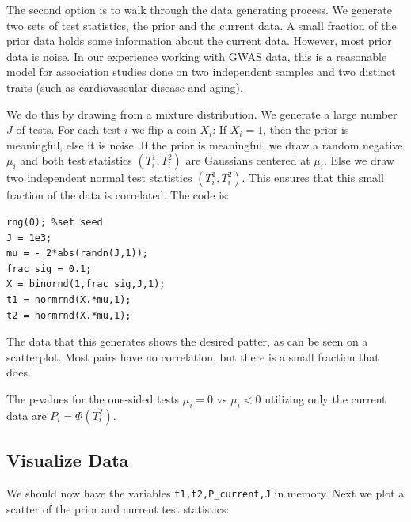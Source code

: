 \documentclass[english,11pt]{article} %
\begin{document}
The second option is to walk through the data generating process. We generate two sets of test statistics, the prior and the current data. A small fraction of the prior data holds some information about the current data. However, most prior data is noise. In our experience working with GWAS data, this is a reasonable model for association studies done on two independent samples and two distinct traits (such as cardiovascular disease and aging).

We do this by drawing from a mixture distribution. We generate a large number $J$ of tests. For each test $i$ we flip a coin $X_i$: If $X_i=1$, then the prior is meaningful, else it is noise. If the prior is meaningful, we draw a random negative $\mu_i$ and both test statistics $(T^{1}_i,T^{2}_i)$ are Gaussians centered at $\mu_i$. Else we draw two independent normal test statistics $(T^{1}_i,T^{2}_i)$. This ensures that this small fraction of the data is correlated. The code is:


\begin{verbatim}
rng(0); %set seed
J = 1e3;
mu = - 2*abs(randn(J,1));
frac_sig = 0.1;
X = binornd(1,frac_sig,J,1);
t1 = normrnd(X.*mu,1);
t2 = normrnd(X.*mu,1);
\end{verbatim}

The data that this generates shows the desired patter, as can be seen on a scatterplot. Most pairs have no correlation, but there is a small fraction that does.

The p-values for the one-sided tests $\mu_i = 0 $ vs $\mu_i <0$ utilizing only the current data are $P_i = \Phi(T^{2}_i)$.


\subsection{Visualize Data}

We should now have the variables \verb+t1,t2,P_current,J+ in memory. Next we plot a scatter of the prior and current test statistics:
\end{document}
